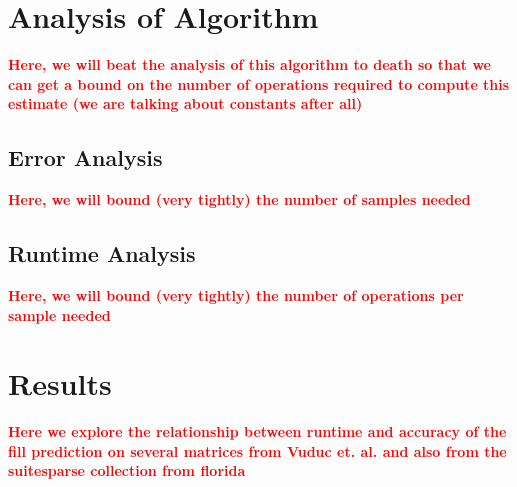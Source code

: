 \documentclass[12pt]{article}
\theoremstyle{dfn}
\numberwithin{equation}{section}
\numberwithin{figure}{section}
\newcommand{\todo}[1] {\textbf{\textcolor{red}{#1}}}
\begin{document}
  \section{Analysis of Algorithm}
    \todo{Here, we will beat the analysis of this algorithm to death so that we can get a bound on the number of operations required to compute this estimate (we are talking about constants after all)}
    \subsection{Error Analysis}
      \todo{Here, we will bound (very tightly) the number of samples needed}
    \subsection{Runtime Analysis}
      \todo{Here, we will bound (very tightly) the number of operations per sample needed}

  \section{Results}
    \todo{Here we explore the relationship between runtime and accuracy of the fill prediction on several matrices from Vuduc et. al. and also from the suitesparse collection from florida}
\end{document}
